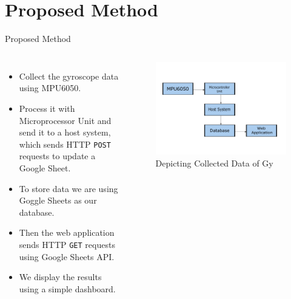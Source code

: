 \documentclass[aspectratio=169,xcolor=dvipsnames]{beamer}
\begin{document}
\section{Proposed Method}

\begin{frame}{Proposed Method}

 \begin{columns}[c]
    \begin{itemize}
        \item Collect the gyroscope data using MPU6050.
        \item Process it with Microprocessor Unit and send it to a host system,
            which sends HTTP \texttt{POST} requests to update a Google Sheet.
        \item To store data we are using Goggle Sheets as our database.
        \item Then the web application sends HTTP \texttt{GET} requests using
            Google Sheets API.
        \item We display the results using a simple dashboard.
    \end{itemize}
    \begin{figure}
        \centering
            \includegraphics[scale=0.2]{flowchart.pdf}
            \caption{Depicting Collected Data of Gy}
            \label{fig:archi}
        \end{figure}
     \end{columns}
\end{frame}

\end{document}
